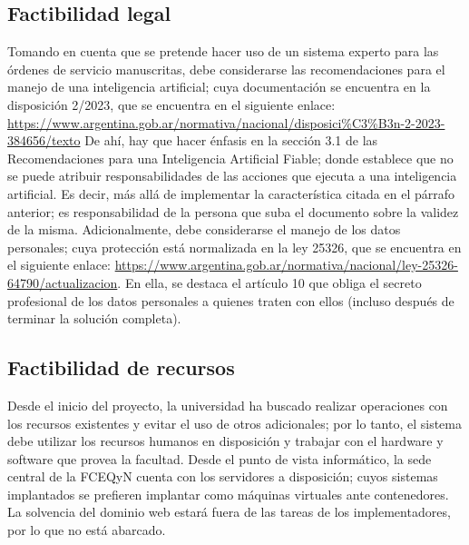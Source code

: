 \subsection{Factibilidad legal}
\normalsize{ \indent
Tomando en cuenta que se pretende hacer uso de un sistema
experto para las \'ordenes de servicio manuscritas, debe
considerarse las recomendaciones para el manejo de una
inteligencia artificial; cuya documentaci\'on se encuentra
en la disposici\'on 2/2023, que se encuentra en el
siguiente enlace:
\url{https://www.argentina.gob.ar/normativa/nacional/disposici\%C3\%B3n-2-2023-384656/texto}
}
\newline
\normalsize{ \indent
De ah\'i, hay que hacer \'enfasis en la secci\'on 3.1 de
las Recomendaciones para una Inteligencia Artificial Fiable;
donde establece que no se puede atribuir responsabilidades
de las acciones que ejecuta a una inteligencia artificial.
Es decir, m\'as all\'a de implementar la caracter\'istica
citada en el p\'arrafo anterior; es responsabilidad de
la persona que suba el documento sobre la validez de la
misma.
}
\newline
\normalsize{ \indent
Adicionalmente, debe considerarse el manejo de los datos
personales; cuya protecci\'on est\'a normalizada en la ley
25326, que se encuentra en el siguiente enlace:
\url{https://www.argentina.gob.ar/normativa/nacional/ley-25326-64790/actualizacion}.
En ella, se destaca el art\'iculo 10 que obliga el secreto
profesional de los datos personales a quienes traten con
ellos (incluso despu\'es de terminar la soluci\'on completa).
}
\subsection{Factibilidad de recursos}
\normalsize{ \indent
Desde el inicio del proyecto, la universidad ha buscado realizar
operaciones con los recursos existentes y evitar el uso de
otros adicionales; por lo tanto, el sistema debe utilizar los
recursos humanos en disposici\'on y trabajar con el hardware
y software que provea la facultad.
}
\newline
\normalsize{ \indent
Desde el punto de vista inform\'atico, la sede central de la
FCEQyN cuenta con los servidores a disposici\'on; cuyos sistemas
implantados se prefieren implantar como m\'aquinas virtuales
ante contenedores. La solvencia del dominio web estar\'a fuera
de las tareas de los implementadores, por lo que no est\'a
abarcado.
}
